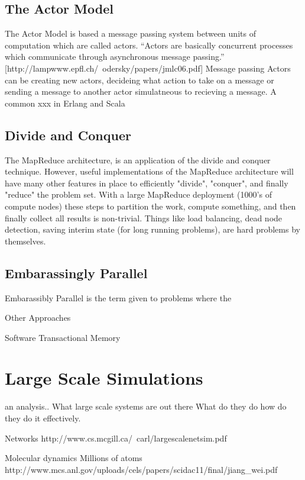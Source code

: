 \documentclass[main.tex]{subfiles}
\begin{document}
{{\subsection{The Actor Model}

The Actor Model is based a message passing system between units of computation which are called actors. ``Actors are basically concurrent processes which communicate through asynchronous message passing.'' [http://lampwww.epfl.ch/~odersky/papers/jmlc06.pdf]
Message passing Actors can be creating new actors, decideing what action to take on a message or sending a message to another actor simulatneous to recieving a message. A common xxx in Erlang and Scala

\subsection{Divide and Conquer}

The MapReduce architecture, is an application of the divide and conquer technique. However, useful implementations of the MapReduce architecture will have many other features in place to efficiently "divide", "conquer", and finally "reduce" the problem set. With a large MapReduce deployment (1000's of compute nodes) these steps to partition the work, compute something, and then finally collect all results is non-trivial. Things like load balancing, dead node detection, saving interim state (for long running problems), are hard problems by themselves.

\subsection{Embarassingly Parallel}

Embarassibly Parallel is the term given to problems where the

Other Approaches

Software Transactional Memory

\section{Large Scale Simulations}

an analysis..
What large scale systems are out there
What do they do how do they do it effectively.

Networks
http://www.cs.mcgill.ca/~carl/largescalenetsim.pdf

Molecular dynamics
Millions of atoms http://www.mcs.anl.gov/uploads/cels/papers/scidac11/final/jiang_wei.pdf


}}
\end{document}
